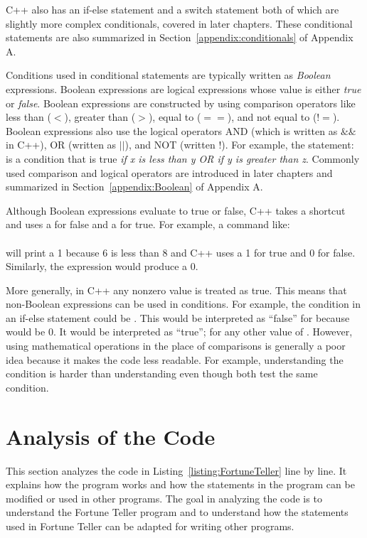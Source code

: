 C++ also has an if-else statement and a switch statement both of which are slightly more complex conditionals, covered in later chapters.  These conditional statements are also summarized in Section~\ref{appendix:conditionals} of Appendix A.  

Conditions used in conditional statements are typically written as \emph{Boolean} expressions.  Boolean expressions are logical expressions whose value is either \emph{true} or \emph{false}.  Boolean expressions are constructed by using comparison operators like less than ($<$), greater than ($>$), equal to ($==$), and not equal to ($!=$).  Boolean expressions also use the logical operators AND (which is written as $\&\&$ in C++), OR (written as $||$), and NOT (written $!$).  For example, the 
statement:\\
is a condition that is true \emph{if x is less than y OR if y is greater than z}. 
Commonly used comparison and logical operators are introduced in later chapters and summarized in Section~\ref{appendix:Boolean} of Appendix A.  

Although Boolean expressions evaluate to true or false, C++ takes a shortcut and uses a  for false and a  for true.  For example, a command like:\\
\\
will print a 1 because 6 is less than 8 and C++ uses a 1 for true and 0 for false.  Similarly, the expression  would produce a 0.  

More generally, in C++ any nonzero value is treated as true.  This means that non-Boolean expressions can be used in conditions.  For example, the condition in an if-else statement could be .  This would be interpreted as ``false'' for  because  would be 0.  It would be interpreted as ``true''; for any other value of .  However, using mathematical operations in the place of comparisons is generally a poor idea because it makes the code less readable.  For example, understanding the condition  is harder than understanding  even though both test the same condition.  


\section{Analysis of the Code}

This section analyzes the code in Listing~\ref{listing:FortuneTeller} line by line.  It explains how the program works and how the statements in the program can be modified or used in other programs.  The goal in analyzing the code is to understand the Fortune Teller program and to understand how the statements used in Fortune Teller can be adapted for writing other programs.

